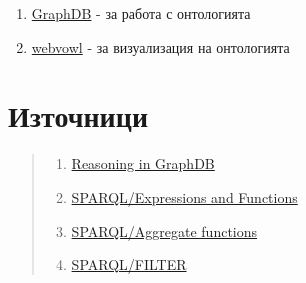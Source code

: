 \documentclass[12pt]{article}
\begin{document}
    \begin{enumerate}
    
    \item \href{https://ontotext.com/products/graphdb/}{GraphDB} - за работа с онтологията
    \item \href{http://vowl.visualdataweb.org/webvowl-old/webvowl-old.html}{webvowl} - за визуализация на онтологията
        
    \end{enumerate}

    




\listoffigures

\section{Източници}

\begin{quote}

    \begin{enumerate}
    
    \item \href{https://graphdb.ontotext.com/documentation/10.2/reasoning.html}{Reasoning in GraphDB}

    \item \href{https://en.wikibooks.org/wiki/SPARQL/Expressions_and_Functions}{SPARQL/Expressions and Functions}

    \item \href{https://en.wikibooks.org/wiki/SPARQL/Aggregate_functions}{SPARQL/Aggregate functions}

    \item \href{https://en.wikibooks.org/wiki/SPARQL/FILTER}{SPARQL/FILTER}
        
    \end{enumerate}

\end{quote}
\end{document}
